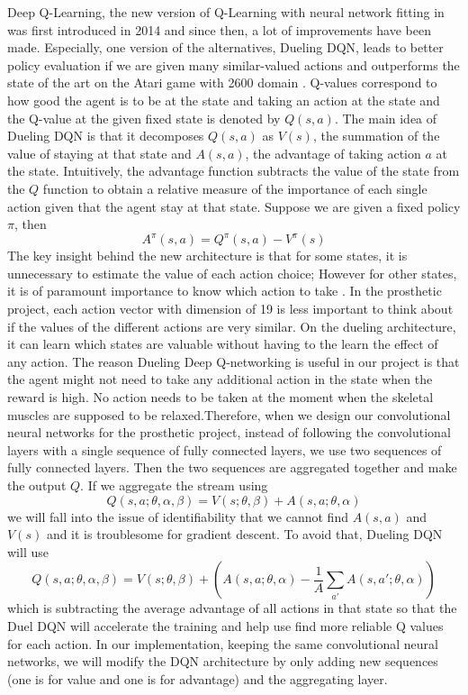 \documentclass[journal,onecolumn]{IEEEtran}
\begin{document}
Deep Q-Learning, the new version of Q-Learning with neural network fitting in was first introduced in 2014 and since then, a lot of improvements have been made. Especially, one version of the alternatives, Dueling DQN, leads to better policy evaluation if we are given many similar-valued actions and outperforms the state of the art on the Atari game with 2600 domain . Q-values correspond to how good the agent is to be at the state and taking an action at the state and the Q-value at the given fixed state is denoted by $Q(s,a)$. The main idea of Dueling DQN is that it decomposes $Q(s,a)$ as $V(s)$, the summation of the value of staying at that state and $A(s,a)$, the advantage of taking action $a$ at the state. Intuitively, the advantage function subtracts the value of the state from the $Q$ function to obtain a relative measure of the importance of each single action given that the agent stay at that state. Suppose we are given a fixed policy $\pi$, then $$A^{\pi}(s,a) = Q^{\pi}(s,a) - V^{\pi}(s)$$ The key insight behind the new architecture is that for some states, it is unnecessary to estimate the value of each action choice; However for other states, it is of paramount importance to know which action to take . In the prosthetic project, each action vector with dimension of 19 is less important to think about if the values of the different actions are very similar. On the dueling architecture, it can learn which states are valuable without having to the learn the effect of any action. The reason Dueling Deep Q-networking is useful in our project is that the agent might not need to take any additional action in the state when the reward is high. No action needs to be taken at the moment when the skeletal muscles are supposed to be relaxed.Therefore, when we design our convolutional neural networks for the prosthetic project, instead of following the convolutional layers with a single sequence of fully connected  layers, we use two sequences of fully connected layers. Then the two sequences are aggregated together and make the output $Q$. If we aggregate the stream using $$ Q(s,a;\theta,\alpha,\beta) = V(s;\theta,\beta) + A(s,a;\theta,\alpha) $$ we will fall into the issue of identifiability that we cannot find $A(s,a)$ and $V(s)$ and it is troublesome for gradient descent. To avoid that, Dueling DQN will use $$Q(s,a;\theta,\alpha,\beta) = V(s;\theta,\beta) + (A(s,a;\theta,\alpha) - \frac{1}{A}\sum_{a'}{A(s,a';\theta,\alpha)})$$ which is subtracting the average advantage of all actions in that state so that the Duel DQN will accelerate the training and help use find more reliable Q values for each action. In our implementation, keeping the same convolutional neural networks, we will modify the DQN architecture by only adding new sequences (one is for value and one is for advantage) and the aggregating layer.
\end{document}
